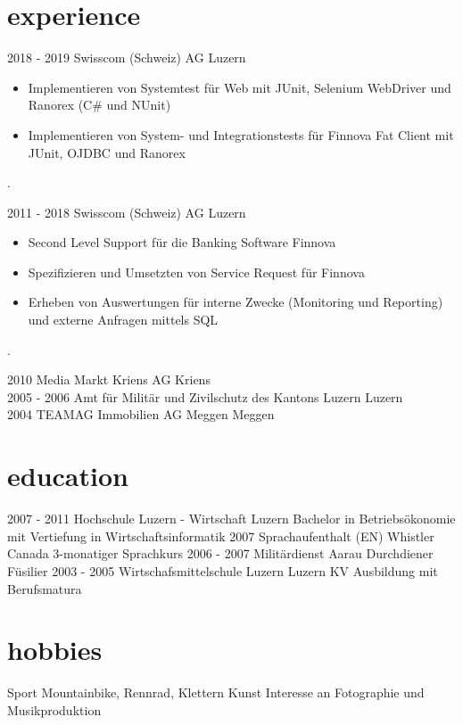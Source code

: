 \documentclass[]{cv-style} %
\begin{document}
\section{experience}
\begin{entrylist}
\entry
{2018 - 2019}
{Swisscom (Schweiz) AG}
{Luzern}
{
\begin{itemize}
  \item Implementieren von Systemtest für Web mit JUnit, Selenium WebDriver und Ranorex (C\# und NUnit)
  \item Implementieren von System- und Integrationstests für Finnova Fat Client mit JUnit, OJDBC und Ranorex
\end{itemize}
.}
\entry
  {2011 - 2018}
  {Swisscom (Schweiz) AG}
  {Luzern}
  {
\begin{itemize}
  \item Second Level Support für die Banking Software Finnova 
  \item Spezifizieren und Umsetzten von Service Request für Finnova
  \item Erheben von Auswertungen für interne Zwecke (Monitoring und Reporting) und externe Anfragen mittels SQL
\end{itemize}
.}
\entry
  {2010}
  {Media Markt Kriens AG}
  {Kriens}
  {}\\
\entry
  {2005 - 2006}
  {Amt für Militär und Zivilschutz des Kantons Luzern}
  {Luzern}
  {}\\
\entry
  {2004}
  {TEAMAG Immobilien AG Meggen}
  {Meggen}
  {}
\end{entrylist}
\section{education}
\begin{entrylist}
\entry
{2007 - 2011}
{Hochschule Luzern - Wirtschaft}
{Luzern}
{Bachelor in Betriebsökonomie mit Vertiefung in Wirtschaftsinformatik}
\entry
{2007}
{Sprachaufenthalt (EN)}
{Whistler Canada}
{3-monatiger Sprachkurs}
\entry
{2006 - 2007}
{Militärdienst}
{Aarau}
{Durchdiener Füsilier}
\entry
{2003 - 2005}
{Wirtschafsmittelschule Luzern}
{Luzern}
{KV Ausbildung mit Berufsmatura}
\end{entrylist} 
\section{hobbies}
\begin{entrylist}
\entry
{}
{Sport}
{}
{Mountainbike, Rennrad, Klettern}
\entry
{}
{Kunst}
{}
{Interesse an Fotographie und Musikproduktion}
\end{entrylist}
\end{document}
